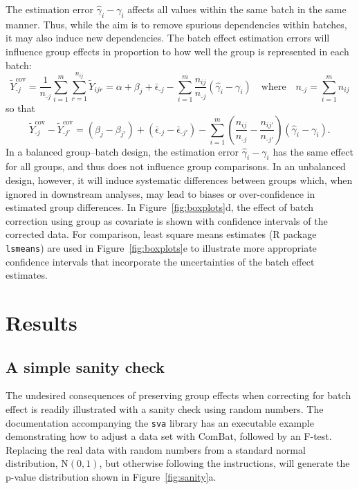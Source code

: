 \documentclass{bio}
\begin{document}
The estimation error $\hat\gamma_i-\gamma_i$ affects all values within the same batch in the same manner. Thus, while the aim is to remove spurious dependencies within batches, it may also induce new dependencies. The batch effect estimation errors will influence group effects in proportion to how well the group is represented in each batch:
\begin{equation}
\tilde{Y}^{\textrm{cov}}_{\textrm{-}j}
=\frac{1}{n_{\textrm{-}j}} \sum_{i=1}^m\sum_{r=1}^{n_{ij}}\tilde{Y}_{ijr}
=\alpha+\beta_j+\bar{\epsilon}_{\textrm{-}j}
  -\sum_{i=1}^m \frac{n_{ij}}{n_{\textrm{-}j}}(\hat{\gamma}_i-\gamma_i)
\quad\text{where}\quad
n_{\textrm{-}j}=\sum_{i=1}^m n_{ij}
\end{equation}
so that
\begin{equation}
\tilde{Y}^{\textrm{cov}}_{\textrm{-}j}-\tilde{Y}^{\textrm{cov}}_{\textrm{-}j'}
=(\beta_j-\beta_{j'})+(\bar{\epsilon}_{\textrm{-}j}-\bar{\epsilon}_{\textrm{-}j'})
 -\sum_{i=1}^m \left(\frac{n_{ij}}{n_{\textrm{-}j}}-\frac{n_{ij'}}{n_{\textrm{-}j'}}\right)(\hat{\gamma}_i-\gamma_i).
\end{equation}
In a balanced group--batch design, the estimation error $\hat\gamma_i-\gamma_i$ has the same effect for all groups, and thus does not influence group comparisons. In an unbalanced design, however, it will induce systematic differences between groups which, when ignored in downstream analyses, may lead to biases or over-confidence in estimated group differences. In Figure~\ref{fig:boxplots}d, the effect of batch correction using group as covariate is shown with confidence intervals of the corrected data. For comparison, least square means estimates (R package \texttt{lsmeans}) are used in Figure~\ref{fig:boxplots}e to illustrate more appropriate confidence intervals that incorporate the uncertainties of the batch effect estimates.


\section{Results}

\subsection{A simple sanity check}

The undesired consequences of preserving group effects when correcting for batch effect is readily illustrated with a sanity check using random numbers. The documentation accompanying the \texttt{sva} library has an executable example demonstrating how to adjust a data set with ComBat, followed by an F-test. Replacing the real data with random numbers from a standard normal distribution, $\text{N}(0,1)$, but otherwise following the instructions, will generate the p-value distribution shown in Figure~\ref{fig:sanity}a.
\end{document}
